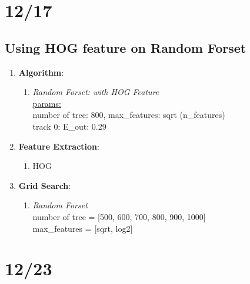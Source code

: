 \documentclass[12pt]{article}
\theoremstyle{definition}
\theoremstyle{remark}
\begin{document}
\section{12/17}
\subsection{Using HOG feature on Random Forset}
\begin{enumerate}
  \item \textbf{Algorithm}:
      \begin{enumerate}
          \item {\em Random Forset: with HOG Feature\/} \\
            \underline{params:} \\
            number of tree: 800, max\_features: sqrt (n\_features)\\
            {\color{red}track 0: E\_out: 0.29}
      \end{enumerate}
    \item \textbf{Feature Extraction}:
      \begin{enumerate}
        \item HOG
      \end{enumerate}
    \item \textbf{Grid Search}:
      \begin{enumerate}
        \item {\em Random Forset\/} \\
          number of tree = [500, 600, 700, 800, 900, 1000] \\
          max\_features = [sqrt, log2]
      \end{enumerate}
\end{enumerate}
\newpage
\section{12/23}
\end{document}
